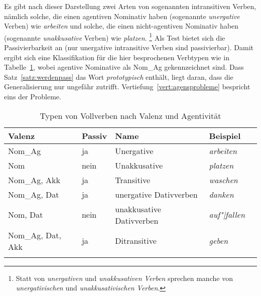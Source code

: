 


Es gibt nach dieser Darstellung zwei Arten von sogenannten intransitiven Verben, nämlich solche, die einen agentiven Nominativ haben (sogenannte \textit{unergative} Verben) wie \textit{arbeiten} und solche, die einen nicht-agentiven Nominativ haben (sogenannte \textit{unakkusative} Verben) wie \textit{platzen}.%
\footnote{Statt von \textit{unergativen} und \textit{unakkusativen Verben} sprechen manche von \textit{unergativischen} und \textit{unakkusativischen Verben}.}
Als Test bietet sich die Passivierbarkeit an (nur unergative intransitive Verben sind passivierbar).
Damit ergibt sich eine Klassifikation für die hier besprochenen Verbtypen wie in Tabelle~\ref{tab:werdenpassivundverbtypen131}, wobei agentive Nominative als Nom\_Ag gekennzeichnet sind.
Dass Satz~\ref{satz:werdenpass} das Wort \textit{prototypisch} enthält, liegt daran, dass die Generalisierung nur ungefähr zutrifft.
Vertiefung~\ref{vert:agensprobleme} bespricht eins der Probleme.

\begin{table}[!htbp]
    \begin{tabular}{lllll}
      \lsptoprule
      \textbf{Valenz} & \textbf{Passiv} & \textbf{Name} & \textbf{Beispiel} \\
      \midrule
      Nom\_Ag & ja & Unergative & \textit{arbeiten} \\
      Nom & nein & Unakkusative & \textit{platzen} \\
      Nom\_Ag, Akk & ja & Transitive & \textit{waschen} \\
      Nom\_Ag, Dat & ja & unergative Dativverben & \textit{danken} \\
      Nom, Dat & nein & unakkusative Dativverben & \textit{auf"|fallen} \\
      Nom\_Ag, Dat, Akk & ja & Ditransitive & \textit{geben} \\
      \lspbottomrule
    \end{tabular}
  \caption{Typen von Vollverben nach Valenz und Agentivität}
  \label{tab:werdenpassivundverbtypen131}
\end{table}


